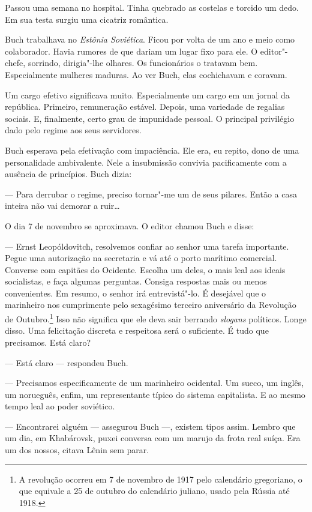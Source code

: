 Passou uma semana no hospital. Tinha quebrado as costelas e torcido um
dedo. Em sua testa surgiu uma cicatriz romântica.

Buch trabalhava no \emph{Estônia Soviética}. Ficou por volta de um ano e
meio como colaborador. Havia rumores de que dariam um lugar fixo para
ele. O editor"-chefe, sorrindo, dirigia"-lhe olhares. Os funcionários o
tratavam bem. Especialmente mulheres maduras. Ao ver Buch, elas
cochichavam e coravam.

Um cargo efetivo significava muito. Especialmente um cargo em um jornal
da república. Primeiro, remuneração estável. Depois, uma variedade de
regalias sociais. E, finalmente, certo grau de impunidade pessoal. O
principal privilégio dado pelo regime aos seus servidores.

Buch esperava pela efetivação com impaciência. Ele era, eu repito, dono
de uma personalidade ambivalente. Nele a insubmissão convivia
pacificamente com a ausência de princípios. Buch dizia:

--- Para derrubar o regime, preciso tornar"-me um de seus pilares. Então
a casa inteira não vai demorar a ruir\ldots{}

O dia 7 de novembro se aproximava. O editor chamou Buch e disse:

--- Ernst Leopóldovitch, resolvemos confiar ao senhor uma tarefa
importante. Pegue uma autorização na secretaria e vá até o porto marítimo
comercial. Converse com capitães do Ocidente. Escolha um deles, o mais
leal aos ideais socialistas, e faça algumas perguntas. Consiga respostas
mais ou menos convenientes. Em resumo, o senhor irá entrevistá"-lo. É
desejável que o marinheiro nos cumprimente pelo sexagésimo terceiro
aniversário da Revolução de Outubro.\footnote{A revolução ocorreu em 7 de novembro de 1917 pelo calendário gregoriano, o que equivale a 25 de outubro do calendário juliano, usado pela Rússia até 1918.} Isso não significa que ele deva
sair berrando \emph{slogans} políticos. Longe disso. Uma felicitação
discreta e respeitosa será o suficiente. É tudo que precisamos. Está
claro?

--- Está claro --- respondeu Buch.

--- Precisamos especificamente de um marinheiro ocidental. Um sueco, um
inglês, um norueguês, enfim, um representante típico do sistema
capitalista. E ao mesmo tempo leal ao poder soviético.

--- Encontrarei alguém --- assegurou Buch ---, existem tipos assim.
Lembro que um dia, em Khabárovsk, puxei conversa com um marujo da frota
real suíça. Era um dos nossos, citava Lênin sem parar.

